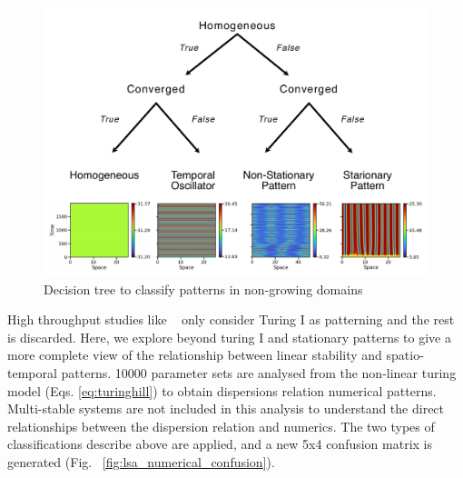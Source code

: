 \begin{figure}[H] %
    \centering
    \begin{adjustbox}{center}
    \includegraphics[width=1.2\textwidth]{chapters/Chapter 1/no growth classification} %
    \end{adjustbox}
    \caption{Decision tree to classify patterns in non-growing domains}
    \label{fig:no growth classification} %
\end{figure}


High throughput studies like ~\cite{Scholes2019, Zheng2016, Marcon} only consider Turing I as patterning and the rest is discarded.
Here, we explore beyond turing I and stationary patterns to give a more complete view of the relationship between linear stability and spatio-temporal patterns.
10000 parameter sets are analysed from the non-linear turing model (Eqs. \eqref{eq:turinghill}) to obtain dispersions relation numerical patterns.
Multi-stable systems are not included in this analysis to understand the direct relationships between the dispersion relation and numerics.
The two types of classifications describe above are applied, and a new 5x4 confusion matrix is generated (Fig. ~\ref{fig:lsa_numerical_confusion}).  %

